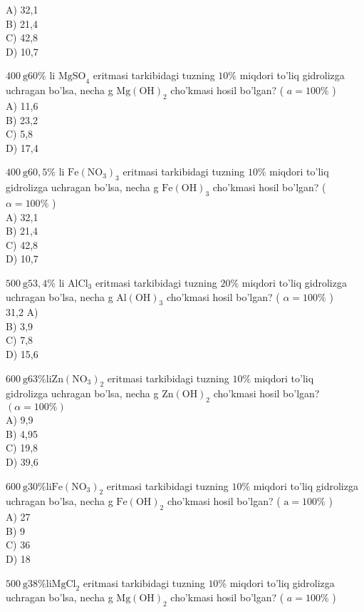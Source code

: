 A) 32,1\\
B) 21,4\\
C) 42,8\\
D) 10,7
  \item $400 \mathrm{~g} 60 \%$ li $\mathrm{MgSO}_{4}$ eritmasi tarkibidagi tuzning $10 \%$ miqdori to'liq gidrolizga uchragan bo'lsa, necha g $\mathrm{Mg}(\mathrm{OH})_{2}$ cho'kmasi hosil bo'lgan? ( $a=100 \%$ )\\
A) 11,6\\
B) 23,2\\
C) 5,8\\
D) 17,4
  \item $400 \mathrm{~g} 60,5 \%$ li $\mathrm{Fe}\left(\mathrm{NO}_{3}\right)_{3}$ eritmasi tarkibidagi tuzning $10 \%$ miqdori to'liq gidrolizga uchragan bo'lsa, necha g $\mathrm{Fe}(\mathrm{OH})_{3}$ cho'kmasi hosil bo'lgan? ( $\alpha=100 \%$ )\\
A) 32,1\\
B) 21,4\\
C) 42,8\\
D) 10,7
  \item $500 \mathrm{~g} 53,4 \%$ li $\mathrm{AlCl}_{3}$ eritmasi tarkibidagi tuzning $20 \%$ miqdori to'liq gidrolizga uchragan bo'lsa, necha g $\mathrm{Al}(\mathrm{OH})_{3}$ cho'kmasi hosil bo'lgan? ( $\alpha=100 \%$ )\\
31,2 A)\\
B) 3,9\\
C) 7,8\\
D) 15,6
  \item $600 \mathrm{~g} 63 \% \mathrm{li} \mathrm{Zn}\left(\mathrm{NO}_{3}\right)_{2}$ eritmasi tarkibidagi tuzning $10 \%$ miqdori to'liq\\
gidrolizga uchragan bo'lsa, necha g $\mathrm{Zn}(\mathrm{OH})_{2}$ cho'kmasi hosil bo'lgan? $(\alpha=100 \%)$\\
A) 9,9\\
B) 4,95\\
C) 19,8\\
D) 39,6
  \item $600 \mathrm{~g} 30 \% \mathrm{li} \mathrm{Fe}\left(\mathrm{NO}_{3}\right)_{2}$ eritmasi tarkibidagi tuzning $10 \%$ miqdori to'liq gidrolizga uchragan bo'lsa, necha g $\mathrm{Fe}(\mathrm{OH})_{2}$ cho'kmasi hosil bo'lgan? ( $\mathrm{a}=100 \%$ )\\
A) 27\\
B) 9\\
C) 36\\
D) 18
  \item $500 \mathrm{~g} 38 \% \mathrm{li} \mathrm{MgCl}_{2}$ eritmasi tarkibidagi tuzning $10 \%$ miqdori to'liq gidrolizga uchragan bo'lsa, necha g $\mathrm{Mg}(\mathrm{OH})_{2}$ cho'kmasi hosil bo'lgan? ( $a=100 \%$ )\\
